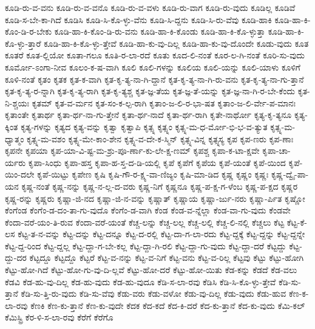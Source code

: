 {ಕೂಡಿ-ರು-ವ-ವನು
ಕೂಡಿ-ರು-ವ-ವನೊ
ಕೂಡಿ-ರು-ವ-ವಳು
ಕೂಡಿ-ರು-ವಾಗ
ಕೂಡಿ-ರು-ವುದು
ಕೂಡಿಲ್ಲ
ಕೂಡಿವೆ
ಕೂಡಿ-ಸ-ಬೇ-ಕಾ-ಗಿದೆ
ಕೂಡಿಸಿ
ಕೂಡಿ-ಸಿ-ಕೊ-ಳ್ಳು-ವೆನು
ಕೂಡಿ-ಸಿ-ದ್ದನು
ಕೂಡಿ-ಸಿ-ರು-ವೆವು
ಕೂಡಿ-ಹಾಕಿ
ಕೂಡಿ-ಹಾ-ಕಿ-ಕೊಂ-ಡಿ-ರ-ಬೇಕು
ಕೂಡಿ-ಹಾ-ಕಿ-ಕೊಂ-ಡಿ-ರು-ವನು
ಕೂಡಿ-ಹಾ-ಕಿ-ಕೊಂಡು
ಕೂಡಿ-ಹಾ-ಕಿ-ಕೊ-ಳ್ಳುತ್ತಾ
ಕೂಡಿ-ಹಾ-ಕಿ-ಕೊ-ಳ್ಳು-ತ್ತಾರೆ
ಕೂಡಿ-ಹಾ-ಕಿ-ಕೊ-ಳ್ಳು-ತ್ತೇವೆ
ಕೂಡಿ-ಹಾ-ಕು-ವು-ದಿಲ್ಲ
ಕೂಡಿ-ಹಾ-ಕು-ವು-ದೊಂದೇ
ಕೂಡು-ವುದು
ಕೂತ
ಕೂತರೆ
ಕೂತ-ಲ್ಲಿಯೋ
ಕೂತಾ-ಗಲೂ
ಕೂತಿ-ರ-ಲಾ-ರದೆ
ಕೂತು
ಕೂದ-ಲಿ-ನಂತೆ
ಕೂರ-ಲ-ಗಿ-ನಂತೆ
ಕೂರಿ-ಸು-ವುದು
ಕೂರ್ಮೋ-ಽಂಗಾ-ನೀವ
ಕೂಲಂ-ಕ-ಷ-ವಾಗಿ
ಕೂಲಿ
ಕೂಲಿ-ಗಳನ್ನು
ಕೂಲಿಯ
ಕೂಲಿ-ಯನ್ನು
ಕೂಲಿ-ಯಾಳು
ಕೂಳಿಗೆ
ಕೂಳಿ-ನಂತೆ
ಕೃತಂ
ಕೃತಕ
ಕೃತ-ಕ-ವಾಗಿ
ಕೃತ-ಕೃ-ತ್ಯ-ನಾ-ಗಿ-ದ್ದಾನೆ
ಕೃತ-ಕೃ-ತ್ಯ-ನಾ-ಗಿ-ರು-ವನು
ಕೃತ-ಕೃ-ತ್ಯ-ನಾ-ಗು-ತ್ತಾನೆ
ಕೃತ-ಕೃ-ತ್ಯ-ರ-ನ್ನಾಗಿ
ಕೃತ-ಕೃ-ತ್ಯ-ರಾಗಿ
ಕೃತ-ಕೃ-ತ್ಯಶ್ಚ
ಕೃತ-ಜ್ಞ-ತೆಯ
ಕೃತ-ಜ್ಞ-ತೆ-ಯನ್ನು
ಕೃತ-ಜ್ಞ-ನಾ-ಗಿ-ರ-ಬೇ-ಕೆಂದು
ಕೃತ-ನಿ-ಶ್ಚಯಃ
ಕೃತಮ್
ಕೃತ-ವ-ರ್ಮನ
ಕೃತ-ಸಂ-ಕ-ಲ್ಪ-ರಾಗಿ
ಕೃತಾಂ-ಜ-ಲಿ-ರ-ಭಾ-ಷತ
ಕೃತಾಂ-ಜ-ಲಿ-ರ್ವೇ-ಪ-ಮಾನಃ
ಕೃತಾಂತೇ
ಕೃತಾರ್ಥ
ಕೃತಾ-ರ್ಥ-ನಾ-ಗು-ತ್ತೇನೆ
ಕೃತಾ-ರ್ಥ-ನಾದೆ
ಕೃತಾ-ರ್ಥ-ರಾಗಿ
ಕೃತೇ-ನಾರ್ಥೋ
ಕೃತ್ಯ-ಕೃ-ತ್ಯನೂ
ಕೃತ್ಯ-ಕ್ಕಿಂತ
ಕೃತ್ಯ-ಗಳನ್ನು
ಕೃತ್ಯದ
ಕೃತ್ಯ-ವನ್ನು
ಕೃತ್ವಾ
ಕೃತ್ವಾಪಿ
ಕೃತ್ಸ್ನ
ಕೃತ್ಸ್ನಂ
ಕೃತ್ಸ್ನ-ಮ-ಧ-ರ್ಮೋ-ಭಿ-ಭ-ವ-ತ್ಯುತ
ಕೃತ್ಸ್ನ-ಮ-ಧ್ಯಾತ್ಮಂ
ಕೃತ್ಸ್ನ-ಮ-ವಶಂ
ಕೃತ್ಸ್ನ-ಮೇ-ಕಾಂ-ಶೇನ
ಕೃತ್ಸ್ನ-ವ-ದೇ-ಕ-ಸ್ಮಿನ್
ಕೃತ್ಸ್ನ-ವಿನ್ನ
ಕೃತ್ಸ್ನಸ್ಯ
ಕೃಪ
ಕೃಪ-ಣರು
ಕೃಪ-ಣಾಃ
ಕೃಪನೇ
ಕೃಪಯಾ
ಕೃಪ-ಯಾ-ವಿ-ಷ್ಟ-ಮ-ಶ್ರು-ಪೂ-ರ್ಣಾ-ಕು-ಲೇ-ಕ್ಷ-ಣಮ್
ಕೃಪಶ್ಚ
ಕೃಪಾ-ಕ-ಟಾ-ಕ್ಷವೇ
ಕೃಪಾ-ಚಾ-ರ್ಯರು
ಕೃಪಾ-ಸಿಂಧು
ಕೃಪಾ-ಹಸ್ತ
ಕೃಪಾ-ಹ-ಸ್ತ-ದ-ಡಿ-ಯಲ್ಲಿ
ಕೃಪೆ
ಕೃಪೆಗೆ
ಕೃಪೆಯ
ಕೃಪೆ-ಯಂತೆ
ಕೃಪೆ-ಯಿಂದ
ಕೃಪೆ-ಯಿಂ-ದಲೇ
ಕೃಪೆ-ಯಿಟ್ಟು
ಕೃಪೇಣ
ಕೃಷಿ
ಕೃಷಿ-ಗೌ-ರ-ಕ್ಷ್ಯ-ವಾ-ಣಿಜ್ಯಂ
ಕೃಷಿ-ಮಾ-ಡಿದ
ಕೃಷ್ಣ
ಕೃಷ್ಣಂ
ಕೃಷ್ಣಃ
ಕೃಷ್ಣ-ದ್ವೈ-ಪಾ-ಯನ
ಕೃಷ್ಣ-ನಂತೆ
ಕೃಷ್ಣ-ನನ್ನು
ಕೃಷ್ಣ-ನ-ಲ್ಲ-ದ-ವರು
ಕೃಷ್ಣ-ನಿಗೆ
ಕೃಷ್ಣನೂ
ಕೃಷ್ಣ-ಪ-ಕ್ಷ-ಗ-ಳೆಂಬ
ಕೃಷ್ಣ-ಪ-ಕ್ಷದ
ಕೃಷ್ಣರ
ಕೃಷ್ಣ-ರನ್ನು
ಕೃಷ್ಣರು
ಕೃಷ್ಣಾ-ಜಿ-ನದ
ಕೃಷ್ಣಾ-ಜಿ-ನ-ವನ್ನು
ಕೃಷ್ಣಾತ್
ಕೃಷ್ಣಾಯ
ಕೃಷ್ಣಾ-ರ್ಜು-ನರು
ಕೃಷ್ಣಾ-ರ್ಪಿತ
ಕೃಷ್ಣೋ
ಕೆಂಗೆಂಡ
ಕೆಂಗೆಂ-ಡ-ದಂ-ತಾ-ಗು-ವುದೊ
ಕೆಂಗೆಂ-ಡ-ವಾಗಿ
ಕೆಂಡ
ಕೆಂಡ-ವ-ನ್ನೆಲ್ಲಾ
ಕೆಂಡ-ವಾ-ಗು-ವುದು
ಕೆಂಡವೇ
ಕೆಂದಾ-ವರೆ-ಯಂ-ತಿ-ರುವ
ಕೆಂದಾ-ವರೆ-ಯಂತೆ
ಕೆಚ್ಚ-ಲನ್ನು
ಕೆಚ್ಚ-ಲಲ್ಲ
ಕೆಚ್ಚ-ಲಲ್ಲಿ
ಕೆಚ್ಚ-ಲಿ-ನಲ್ಲಿ
ಕೆಚ್ಚಲು
ಕೆಟ್ಟ
ಕೆಟ್ಟ-ಕೆ-ಲಸ
ಕೆಟ್ಟ-ತ-ನ-ವನ್ನು
ಕೆಟ್ಟ-ದನ್ನು
ಕೆಟ್ಟ-ದನ್ನೂ
ಕೆಟ್ಟ-ದ-ರಲ್ಲಿ
ಕೆಟ್ಟ-ದಾ-ಗ-ಲಾ-ರದು
ಕೆಟ್ಟ-ದ್ದಕ್ಕೆ
ಕೆಟ್ಟ-ದ್ದನ್ನು
ಕೆಟ್ಟ-ದ್ದನ್ನೇ
ಕೆಟ್ಟ-ದ್ದ-ರಿಂದ
ಕೆಟ್ಟ-ದ್ದಲ್ಲ
ಕೆಟ್ಟ-ದ್ದಾ-ಗ-ಬೇ-ಕಲ್ಲ
ಕೆಟ್ಟ-ದ್ದಾ-ಗಿ-ರಲಿ
ಕೆಟ್ಟ-ದ್ದಾ-ಗು-ವುದು
ಕೆಟ್ಟ-ದ್ದಾ-ದರೆ
ಕೆಟ್ಟದ್ದು
ಕೆಟ್ಟ-ದ್ದು-ದರ
ಕೆಟ್ಟದ್ದೂ
ಕೆಟ್ಟದ್ದೊ
ಕೆಟ್ಟರೆ
ಕೆಟ್ಟ-ವ-ನನ್ನು
ಕೆಟ್ಟ-ವ-ನಿಗೆ
ಕೆಟ್ಟ-ವನು
ಕೆಟ್ಟ-ವ-ರಿಲ್ಲ
ಕೆಟ್ಟವು
ಕೆಟ್ಟು
ಕೆಟ್ಟು-ಹೋಗಿ
ಕೆಟ್ಟು-ಹೋ-ಗಿದೆ
ಕೆಟ್ಟು-ಹೋ-ಗು-ವು-ದಿ-ಲ್ಲವೆ
ಕೆಟ್ಟು-ಹೋ-ದರೆ
ಕೆಟ್ಟು-ಹೋ-ಯಿತು
ಕೆಡ-ಕನ್ನು
ಕೆಡದೆ
ಕೆಡ-ವಲು
ಕೆಡವಿ
ಕೆಡ-ಹು-ವು-ದಿಲ್ಲ
ಕೆಡ-ಹು-ವುದು
ಕೆಡ-ಹು-ವುದೂ
ಕೆಡಿ-ಸ-ಲಾ-ರವು
ಕೆಡಿಸಿ
ಕೆಡಿ-ಸಿ-ಕೊ-ಳ್ಳು-ತ್ತೇವೆ
ಕೆಡಿ-ಸು-ತ್ತಾನೆ
ಕೆಡಿ-ಸು-ತ್ತಿ-ರು-ವುದು
ಕೆಡಿ-ಸು-ವೆವು
ಕೆಡು-ವರು
ಕೆಡು-ವಳೋ
ಕೆಡು-ವು-ದಿಲ್ಲ
ಕೆಡು-ವುದು
ಕೆಡು-ಹುವ
ಕೆಣ-ಕ-ಲಾ-ರವು
ಕೆಣಕಿ
ಕೆಣ-ಕು-ತ್ತಾನೆ
ಕೆಣ-ಕು-ವುದೇ
ಕೆದಕ
ಕೆದ-ಕದೆ
ಕೆದ-ಕಿ-ದರೆ
ಕೆದ-ಕು-ತ್ತಾನೆ
ಕೆದ-ಕು-ವುದು
ಕೆಮಿ-ಕಲ್
ಕೆಮಿಸ್ಟ್ರಿ
ಕೆರ-ಳಿ-ಸ-ಲಾ-ರವು
ಕೆರೆಗೆ
ಕೆರೆಗೊ
}
